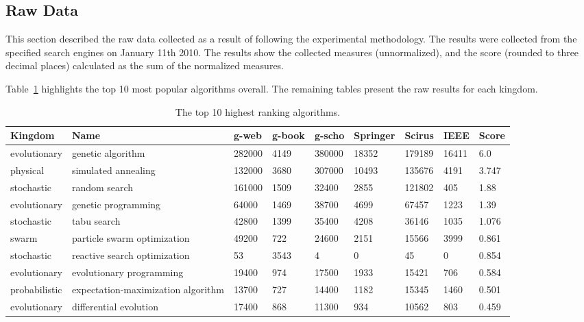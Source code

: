 \documentclass[a4paper, 11pt]{article}
\begin{document}
% 
% 
\subsection{Raw Data}
This section described the raw data collected as a result of following the experimental methodology. The results were collected from the specified search engines on January 11th 2010. The results show the collected measures (unnormalized), and the score (rounded to three decimal places) calculated as the sum of the normalized measures.

Table~\ref{tab:top} highlights the top 10 most popular algorithms overall. The remaining tables present the raw results for each kingdom.

\begin{table}[htp]
	\centering\footnotesize
		\begin{tabularx}{\textwidth}{lXlllllll}
		\toprule
		\textbf{Kingdom} & \textbf{Name} & \textbf{g-web} & \textbf{g-book} & \textbf{g-scho} & \textbf{Springer} & \textbf{Scirus} & \textbf{IEEE} & \textbf{Score} \\ 
		\toprule
		evolutionary & genetic algorithm & 282000 & 4149 & 380000 & 18352 & 179189 & 16411 & 6.0 \\
		physical & simulated annealing & 132000 & 3680 & 307000 & 10493 & 135676 & 4191 & 3.747 \\
		stochastic & random search & 161000 & 1509 & 32400 & 2855 & 121802 & 405 & 1.88 \\
		evolutionary & genetic programming & 64000 & 1469 & 38700 & 4699 & 67457 & 1223 & 1.39 \\
		stochastic & tabu search & 42800 & 1399 & 35400 & 4208 & 36146 & 1035 & 1.076 \\
		swarm & particle swarm optimization & 49200 & 722 & 24600 & 2151 & 15566 & 3999 & 0.861 \\
		stochastic & reactive search optimization & 53 & 3543 & 4 & 0 & 45 & 0 & 0.854 \\
		evolutionary & evolutionary programming & 19400 & 974 & 17500 & 1933 & 15421 & 706 & 0.584 \\
		probabilistic & expectation-maximization algorithm & 13700 & 727 & 14400 & 1182 & 15345 & 1460 & 0.501 \\
		evolutionary & differential evolution & 17400 & 868 & 11300 & 934 & 10562 & 803 & 0.459 \\
		\bottomrule
		\end{tabularx}	
	\caption{The top 10 highest ranking algorithms.}
	\label{tab:top}
\end{table}
\end{document}
